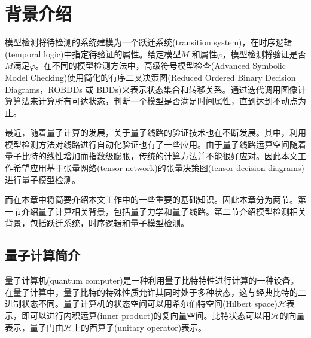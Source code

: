 \chapter{背景介绍}


模型检测将待检测的系统建模为一个跃迁系统(transition system)，在时序逻辑(temporal logic)中指定待验证的属性。给定模型\(M\) 和属性\(\varphi\)，模型检测将验证是否\(M\)满足\(\varphi\)。在不同的模型检测方法中，高级符号模型检查(Advanced Symbolic Model Checking)\citep{Grobelna_2015}使用简化的有序二叉决策图(Reduced Ordered Binary Decision Diagrams，ROBDDs 或 BDDs)\citep{Bryant_1986}来表示状态集合和转移关系。通过迭代调用图像计算算法来计算所有可达状态，判断一个模型是否满足时间属性，直到达到不动点为止。

最近，随着量子计算的发展，关于量子线路的验证技术也在不断发展\citep{viamontes2007checking,burgholzer2020advanced}。其中，利用模型检测方法对线路进行自动化验证也有了一些应用。由于量子线路运算空间随着量子比特的线性增加而指数级膨胀，传统的计算方法并不能很好应对。因此本文工作希望应用基于张量网络(tensor network)的张量决策图(tensor decision diagrams)进行量子模型检测。

而在本章中将简要介绍本文工作中的一些重要的基础知识。因此本章分为两节。第一节介绍量子计算相关背景，包括量子力学和量子线路。第二节介绍模型检测相关背景，包括跃迁系统，时序逻辑和量子模型检测。
\section{量子计算简介}
量子计算机(quantum computer)是一种利用量子比特特性进行计算的一种设备。在量子计算中，量子比特的特殊性质允许其同时处于多种状态，这与经典比特的二进制状态不同。量子计算机的状态空间可以用希尔伯特空间(Hilbert space)\(\mathcal{H}\)表示\citep{nielsen2010quantum}，即可以进行内积运算(inner product)的复向量空间。比特状态可以用\(\mathcal{H}\)的向量表示，量子门由\(\mathcal{H}\)上的酉算子(unitary operator)表示。

